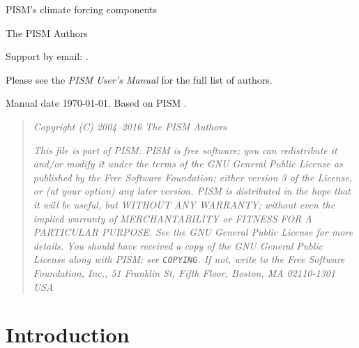 \documentclass[titlepage,letterpaper,final]{scrartcl}
\begin{document}
\begin{titlepage}

  \begin{center}
    \vspace*{3.5cm}
    {\huge{} PISM's climate forcing components}
    \vspace{0.5cm}

    {\Large The PISM Authors}
    \vspace{1cm}
  \end{center}

\setcounter{tocdepth}{3}
\small
\tableofcontents
\normalsize

\vspace{0.3in}

  \begin{center}
    \small Support by email: \PISMEMAIL.

    \medskip
    Please see the \emph{PISM User's Manual} for the full list of authors.

    \medskip
    Manual date \today.  Based on PISM \PISMREV.

    \medskip
    \PISMDOWNLOADMSG
 \end{center}

\vspace{0.3in}
\begin{quote}
  \textsl{Copyright (C) 2004--2016 The PISM Authors}
  \medskip

  \noindent \textsl{This file is part of PISM.  PISM is free software; you can redistribute it and/or modify it under the terms of the GNU General Public License as published by the Free Software Foundation; either version 3 of the License, or (at your option) any later version.  PISM is distributed in the hope that it will be useful, but WITHOUT ANY WARRANTY; without even the implied warranty of MERCHANTABILITY or FITNESS FOR A PARTICULAR PURPOSE.  See the GNU General Public License for more details.  You should have received a copy of the GNU General Public License along with PISM; see \emph{\texttt{COPYING}}.  If not, write to the Free Software Foundation, Inc., 51 Franklin St, Fifth Floor, Boston, MA  02110-1301 USA}
\end{quote}
\normalsize

\end{titlepage}

\newpage


\section{Introduction}
\label{sec:intro}
\end{document}
